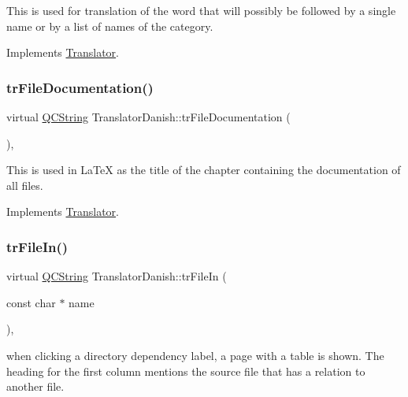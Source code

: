 This is used for translation of the word that will possibly be followed by a single name or by a list of names of the category. 

Implements \mbox{\hyperlink{class_translator}{Translator}}.

\mbox{\label{class_translator_danish_a17c1a50380f634ac0a15efc68269464b}} 
\subsubsection{\texorpdfstring{trFileDocumentation()}{trFileDocumentation()}}
{\footnotesize\ttfamily virtual \mbox{\hyperlink{class_q_c_string}{Q\+C\+String}} Translator\+Danish\+::tr\+File\+Documentation (\begin{DoxyParamCaption}{ }\end{DoxyParamCaption})\hspace{0.3cm}{\ttfamily [inline]}, {\ttfamily [virtual]}}

This is used in La\+TeX as the title of the chapter containing the documentation of all files. 

Implements \mbox{\hyperlink{class_translator}{Translator}}.

\mbox{\label{class_translator_danish_a08d0121dfe4f7373b80e51fbd70bc995}} 
\subsubsection{\texorpdfstring{trFileIn()}{trFileIn()}}
{\footnotesize\ttfamily virtual \mbox{\hyperlink{class_q_c_string}{Q\+C\+String}} Translator\+Danish\+::tr\+File\+In (\begin{DoxyParamCaption}\item[{const char $\ast$}]{name }\end{DoxyParamCaption})\hspace{0.3cm}{\ttfamily [inline]}, {\ttfamily [virtual]}}

when clicking a directory dependency label, a page with a table is shown. The heading for the first column mentions the source file that has a relation to another file. 

